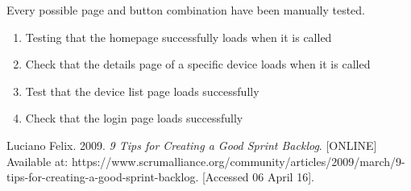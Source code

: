 \documentclass[11pt, a4paper]{article}
\newcounter{subsubsubsection}[subsubsection]
\begin{document}
	Every possible page and button combination have been manually tested. 
	
	\begin{enumerate}
		\item Testing that the homepage successfully loads when it is called
		\item Check that the details page of a specific device loads when it is called
		\item Test that the device list page loads successfully
		\item Check that the login page loads successfully
	\end{enumerate}
	
\begin{thebibliography}{9}
	 Luciano Felix. 2009. \textit{9 Tips for Creating a Good Sprint Backlog}. [ONLINE] Available at: https://www.scrumalliance.org/community/articles/2009/march/9-tips-for-creating-a-good-sprint-backlog. [Accessed 06 April 16].
\end{thebibliography}
		
\end{document}
